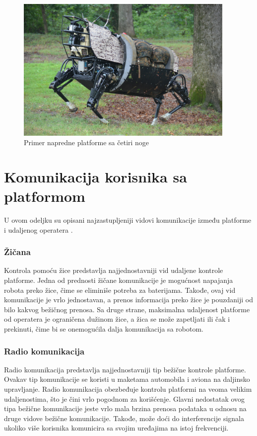 \documentclass[12pt,a4paper]{report}
\begin{document}
\begin{figure}[H]
    \centering    
    \includegraphics[height=7cm, keepaspectratio]{img/legs.jpg}    
    \caption{Primer napredne platforme sa četiri noge}   
    \label{fig:legs}
\end{figure}

\section{Komunikacija korisnika sa platformom}
U ovom odeljku su opisani najzastupljeniji vidovi komunikacije između platforme i udaljenog operatera \cite{communication-types}.

\subsubsection{Žičana}

Kontrola pomoću žice predstavlja najjednostavniji vid udaljene kontrole platforme. Jedna od prednosti žičane komunikacije je mogućnost napajanja robota preko žice, čime se eliminiše potreba za baterijama. Takođe, ovaj vid komunikacije je vrlo jednostavan, a prenos informacija preko žice je pouzdaniji od bilo kakvog bežičnog prenosa. Sa druge strane, maksimalna udaljenost platforme od operatera je ograničena dužinom žice, a žica se može zapetljati ili čak i prekinuti, čime bi se onemogućila dalja komunikacija sa robotom.   

\subsubsection{Radio komunikacija}

Radio komunikacija predstavlja najjednostavniji tip bežične kontrole platforme. Ovakav tip komunikacije se koristi u maketama automobila i aviona na daljinsko upravljanje. Radio komunikacija obezbeđuje kontrolu platformi na veoma velikim udaljenostima, što je čini vrlo pogodnom za korišćenje. Glavni nedostatak ovog tipa bežične komunikacije jeste vrlo mala brzina prenosa podataka u odnosu na druge vidove bežične komunikacije. Takođe, može doći do interferencije signala ukoliko više korisnika komunicira sa svojim uređajima na istoj frekvenciji.
\end{document}
